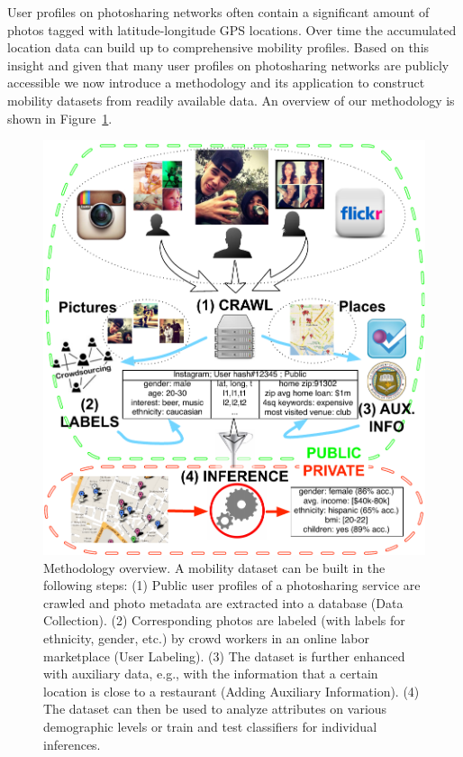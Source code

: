 User profiles on photosharing networks often contain a significant amount of photos tagged with latitude-longitude GPS locations. Over time the accumulated location data can build up to comprehensive mobility profiles. Based on this insight and given that many user profiles on photosharing networks are publicly accessible we now introduce a methodology and its application to construct mobility datasets from readily available data. An overview of our methodology is shown in Figure~\ref{fig:system}. 

\begin{figure}[h]
	\begin{center}
		\includegraphics[width=\linewidth]{fig/footprints/system.pdf}
	\end{center}
	\caption{Methodology overview. A mobility dataset can be built in the following steps: (1) Public user profiles of a photosharing service are crawled and photo metadata are extracted into a database (Data Collection). (2) Corresponding photos are labeled (with labels for ethnicity, gender, etc.) by crowd workers in an online labor marketplace (User Labeling). (3) The dataset is further enhanced with auxiliary data, e.g., with the information that a certain location is close to a restaurant (Adding Auxiliary Information). (4) The dataset can then be used to analyze attributes on various demographic levels or train and test classifiers for individual inferences.}
	\label{fig:system}
\end{figure}


